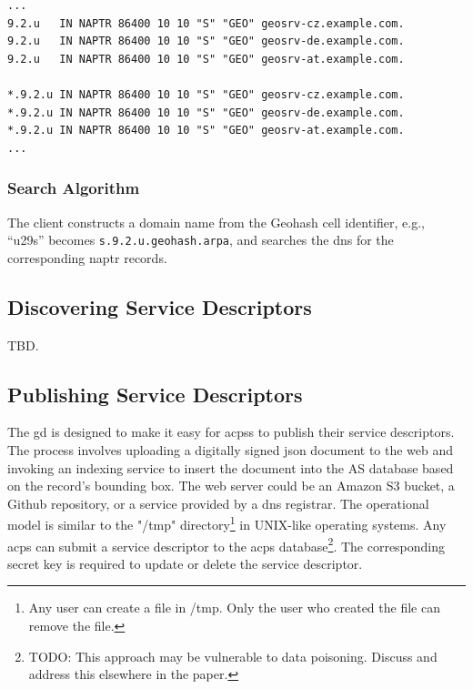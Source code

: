 \documentclass[conference,10pt]{IEEEtran}
\begin{document}
\begin{verbatim}
...
9.2.u   IN NAPTR 86400 10 10 "S" "GEO" geosrv-cz.example.com.
9.2.u   IN NAPTR 86400 10 10 "S" "GEO" geosrv-de.example.com.
9.2.u   IN NAPTR 86400 10 10 "S" "GEO" geosrv-at.example.com.

*.9.2.u IN NAPTR 86400 10 10 "S" "GEO" geosrv-cz.example.com.
*.9.2.u IN NAPTR 86400 10 10 "S" "GEO" geosrv-de.example.com.
*.9.2.u IN NAPTR 86400 10 10 "S" "GEO" geosrv-at.example.com.
...
\end{verbatim}

\subsubsection{Search Algorithm}\label{sec:search-algorithm}

The client constructs a domain name from the Geohash cell identifier, e.g., ``u29s'' becomes \texttt{s.9.2.u.geohash.arpa}, and searches the \gls{dns} for the corresponding \gls{naptr} records.

\subsection{Discovering Service Descriptors}\label{sec:discovering-service-records}

TBD.

\subsection{Publishing Service Descriptors}\label{sec:publishing-service-records}

The \gls{gd} is designed to make it easy for \glspl{acps} to publish their service descriptors. The process involves uploading a digitally signed \gls{json} document to the web and invoking an indexing service to insert the document into the AS database based on the record's bounding box. The web server could be an Amazon S3 bucket, a Github repository, or a service provided by a \gls{dns} registrar. The operational model is similar to the "/tmp" directory\footnote{Any user can create a file in /tmp. Only the user who created the file can remove the file.} in UNIX-like operating systems. Any \gls{acps} can submit a service descriptor to the \gls{acps} database\footnote{TODO: This approach may be vulnerable to data poisoning. Discuss and address this elsewhere in the paper.}. The corresponding secret key is required to update or delete the service descriptor.
\end{document}

